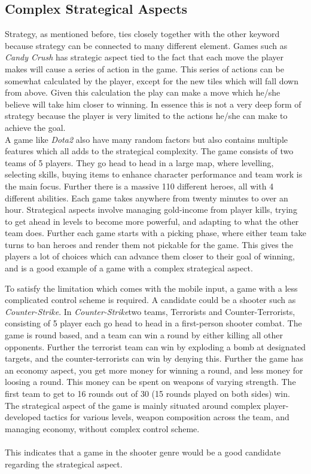 \subsection{Complex Strategical Aspects}
Strategy, as mentioned before, ties closely together with the other keyword because strategy can be connected to many different element. 
Games such as \textit{Candy Crush} has strategic aspect tied to the fact that each move the player makes will cause a series of action in the game.
This series of actions can be somewhat calculated by the player, except for the new tiles which will fall down from above.
Given this calculation the play can make a move which he/she believe will take him closer to winning.
In essence this is not a very deep form of strategy because the player is very limited to the actions he/she can make to achieve the goal.\\
A game like \textit{Dota2} also have many random factors but also contains multiple features which all adds to the strategical complexity.
The game consists of two teams of 5 players. They go head to head in a large map, where levelling, selecting skills, buying items to enhance character performance and team work is the main focus. Further there is a massive 110 different heroes, all with 4 different abilities. Each game takes anywhere from twenty minutes to over an hour. 
Strategical aspects involve managing gold-income from player kills, trying to get ahead in levels to become more powerful, and adapting to what the other team does. Further each game starts with a picking phase, where either team take turns to ban heroes and render them not pickable for the game.   
This gives the players a lot of choices which can advance them closer to their goal of winning, and is a good example of a game with a complex strategical aspect.

To satisfy the limitation which comes with the mobile input, a game with a less complicated control scheme is required.
A candidate could be a shooter such as \textit{Counter-Strike}.
In \textit{Counter-Strike}two teams, Terrorists and Counter-Terrorists, consisting of 5 player each go head to head in a first-person shooter combat. The game is round based, and a team can win a round by either killing all other opponents. Further the terrorist team can win by exploding a bomb at designated targets, and the counter-terrorists can win by denying this. Further the game has an economy aspect, you get more money for winning a round, and less money for loosing a round. This money can be spent on weapons of varying strength. 
The first team to get to 16 rounds out of 30 (15 rounds played on both sides) win. 
The strategical aspect of the game is mainly situated around complex player-developed tactics for various levels, weapon composition across the team, and managing economy, without complex control scheme.\\\\
This indicates that a game in the shooter genre would be a good candidate regarding the strategical aspect.

